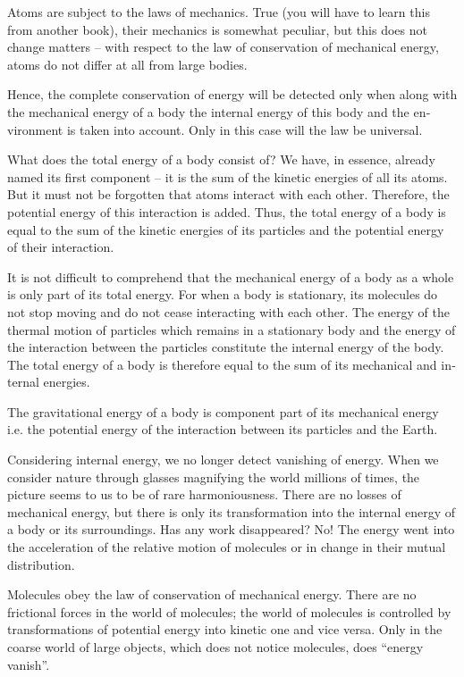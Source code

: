 Atoms are subject to the laws of mechanics. True (you will have to learn this from another book), their mechanics is somewhat peculiar, but this does not change matters -- with respect to the law of conservation of mechanical energy, atoms do not differ at all from large bodies.

Hence, the complete conservation of energy will be detected only when along with the mechanical energy of a body the internal energy of this body and the en­vironment is taken into account. Only in this case will the law be universal.

What does the total energy of a body consist of? We have, in essence, already named its first component -- it is the sum of the kinetic energies of all its atoms. But it must not be forgotten that atoms interact with each other. Therefore, the potential energy of this interaction is added. Thus, the total energy of a body is equal to the sum of the kinetic energies of its particles and the potential energy of their interaction.

It is not difficult to comprehend that the mechanical energy of a body as a whole is only part of its total ener­gy. For when a body is stationary, its molecules do not stop moving and do not cease interacting with each other. The energy of the thermal motion of particles which remains in a stationary body and the energy of the interaction between the particles constitute the internal energy of the body. The total energy of a body is therefore equal to the sum of its mechanical and in­ternal energies.

The gravitational energy of a body is component part of its mechanical energy i.e. the potential energy of the interaction between its particles and the Earth.

Considering internal energy, we no longer detect vanishing of energy. When we consider nature through glasses magnifying the world millions of times, the picture seems to us to be of rare harmoniousness. There are no losses of mechanical energy, but there is only its transformation into the internal energy of a body or its surroundings. Has any work disappeared? No! The energy went into the acceleration of the relative motion of molecules or in change in their mutual distribu­tion.

Molecules obey the law of conservation of mechanical energy. There are no frictional forces in the world of molecules; the world of molecules is controlled by trans­formations of potential energy into kinetic one and vice versa. Only in the coarse world of large objects, which does not notice molecules, does ``energy vanish''.

